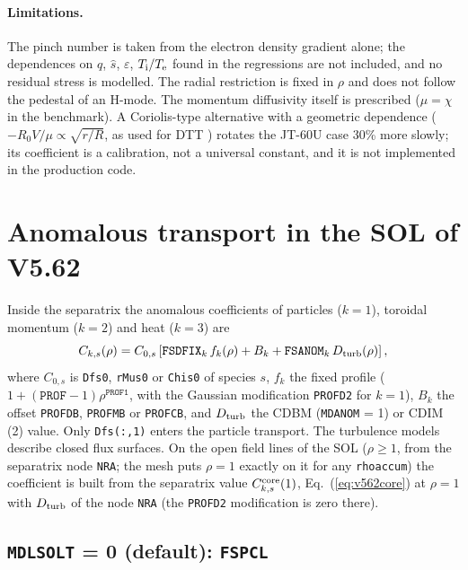 \documentclass[11pt]{article}
\def\r#1{{\rm#1}}
\begin{document}
\paragraph{Limitations.}  The pinch number is taken from the electron density gradient
alone; the dependences on $q$, $\hat{s}$, $\varepsilon$, $T_\r{i}/T_\r{e}$ found in
the regressions are not included, and no residual stress is modelled.  The radial
restriction is fixed in $\rho$ and does not follow the pedestal of an H-mode.  The
momentum diffusivity itself is prescribed ($\mu = \chi$ in the benchmark).  A
Coriolis-type alternative with a geometric dependence ($-R_0V/\mu\propto\sqrt{r/R}$, as
used for DTT \cite{Casiraghi2021}) rotates the JT-60U case 30\% more slowly; its
coefficient is a calibration, not a universal constant, and it is not implemented in
the production code.


\section{Anomalous transport in the SOL of V5.62}
\setcounter{equation}{0}
\label{sec:v562sol}

Inside the separatrix the anomalous coefficients of particles ($k=1$), toroidal
momentum ($k=2$) and heat ($k=3$) are
\begin{equation}
  C_{k,s}(\rho) = C_{0,s}\left[\texttt{FSDFIX}_k\,f_k(\rho) + B_k + \texttt{FSANOM}_k\,D_\r{turb}(\rho)\right],
  \label{eq:v562core}
\end{equation}
where $C_{0,s}$ is \texttt{Dfs0}, \texttt{rMus0} or \texttt{Chis0} of species $s$, $f_k$ the
fixed profile ($1+(\texttt{PROF}-1)\rho^{\texttt{PROF1}}$, with the Gaussian modification
\texttt{PROFD2} for $k=1$), $B_k$ the offset \texttt{PROFDB}, \texttt{PROFMB} or
\texttt{PROFCB}, and $D_\r{turb}$ the CDBM (\texttt{MDANOM} = 1) or CDIM (2) value.  Only
\texttt{Dfs(:,1)} enters the particle transport.  The turbulence models describe closed
flux surfaces.  On the open field lines of the SOL ($\rho\ge1$, from the separatrix node
\texttt{NRA}; the mesh puts $\rho = 1$ exactly on it for any \texttt{rhoaccum}) the
coefficient is built from the separatrix value $C^\r{core}_{k,s}(1)$, Eq.~(\ref{eq:v562core})
at $\rho=1$ with $D_\r{turb}$ of the node \texttt{NRA} (the \texttt{PROFD2} modification is
zero there).

\subsection{\texttt{MDLSOLT} = 0 (default): \texttt{FSPCL}}
\end{document}
